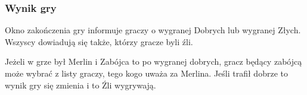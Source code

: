 \documentclass[12pt]{article}
\begin{document}
\newpage
\subsubsection{Wynik gry}
Okno zakończenia gry informuje graczy o wygranej Dobrych lub wygranej Złych. 
Wszyscy dowiadują się także, którzy gracze byli źli.

Jeżeli w grze był Merlin i Zabójca to po wygranej dobrych, gracz będący zabójcą może wybrać z listy graczy, tego kogo uważa za Merlina. Jeśli trafił dobrze to wynik gry się zmienia i to Źli wygrywają.
\begin{figure}[!htb]
    \centering
    \centering
\end{figure}
\end{document}
